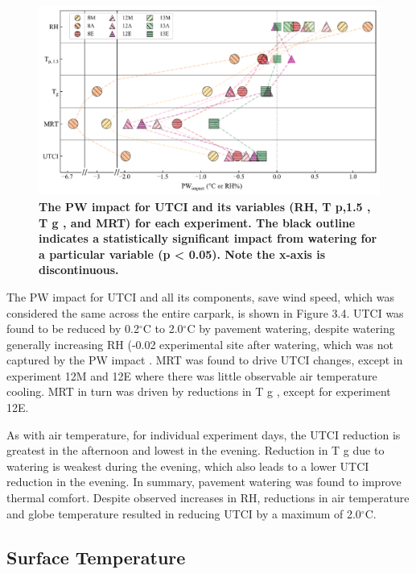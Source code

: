 \documentclass[final,3p,times,authoryear]{elsarticle}
\begin{document}
\begin{figure}
\centering
\includegraphics[trim={0 0 0 0},clip,scale=1.0]{pict015.png}
\caption{\bf The PW impact for UTCI and its variables (RH, T p,1.5 , T g , and MRT) for each experiment. The
black outline indicates a statistically significant impact from watering for a particular variable (p <
0.05). Note the x-axis is discontinuous.}
 \label{fig:3.4}
\end{figure}

The PW impact for UTCI and all its components, save wind speed, which was considered
the same across the entire carpark, is shown in Figure 3.4. UTCI was found to be
reduced by 0.2$^{\circ}$C to 2.0$^{\circ}$C by pavement watering, despite watering generally
increasing RH (-0.02 %
experimental site after watering, which was not captured by the PW impact .
MRT was found to drive UTCI changes, except in experiment 12M and 12E where there
was little observable air temperature cooling. MRT in turn was driven by reductions in
T g , except for experiment 12E.

As with air temperature, for individual experiment days, the UTCI reduction is greatest
in the afternoon and lowest in the evening. Reduction in T g due to watering is weakest
during the evening, which also leads to a lower UTCI reduction in the evening.
In summary, pavement watering was found to improve thermal comfort. Despite
observed increases in RH, reductions in air temperature and globe temperature resulted
in reducing UTCI by a maximum of 2.0$^{\circ}$C.

\subsection{Surface Temperature}\label{sec:discussion3.3}
\end{document}
